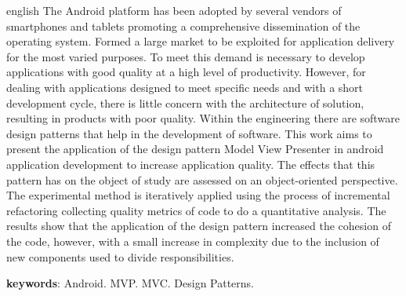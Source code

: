 \documentclass[
	12pt,				%
	a4paper,			%
	oneside,
	english,			%
	brazil,				%
	]{abntex2}
\begin{document}
\begin{resumo}[Abstract]
 \begin{otherlanguage*}{english}
\noindent 
The Android platform has been adopted by several vendors of smartphones and
tablets promoting a comprehensive dissemination of the operating system.
Formed a large market to be exploited for application delivery
for the most varied purposes. To meet this demand is necessary to
develop applications with good quality at a high level of productivity.
However, for dealing with applications designed to meet specific needs and with a
short development cycle, there is little concern with the architecture of
solution, resulting in products with poor quality. Within the engineering
there are software design patterns that help in the development of software.
This work aims to present the application of the design pattern
Model View Presenter in android application development to increase
application quality. The effects that this pattern has on the object of study
are assessed on an object-oriented perspective. The experimental method is
iteratively applied using the process of incremental refactoring
collecting quality metrics of code to do a quantitative analysis.
The results show that the application of the design pattern increased the
cohesion of the code, however, with a small increase in complexity due to the
inclusion of new components used to divide responsibilities.

 \vspace{\onelineskip}

 \noindent
 \textbf{keywords}: Android. MVP. MVC. Design Patterns.
 \end{otherlanguage*}
\end{resumo}


\listoffigures*
\cleardoublepage

\listoftables*
\cleardoublepage
\end{document}
